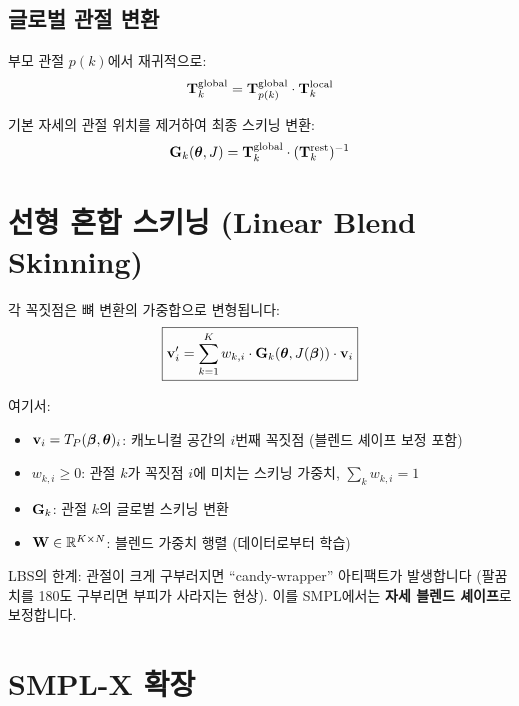 \documentclass[11pt, a4paper]{report}
\begin{document}
\subsection{글로벌 관절 변환}

부모 관절 $p(k)$에서 재귀적으로:
\begin{equation}
\mathbf{T}_k^{\text{global}} = \mathbf{T}_{p(k)}^{\text{global}} \cdot \mathbf{T}_k^{\text{local}}
\end{equation}

기본 자세의 관절 위치를 제거하여 최종 스키닝 변환:
\begin{equation}
\mathbf{G}_k(\bm{\theta}, J) = \mathbf{T}_k^{\text{global}} \cdot (\mathbf{T}_k^{\text{rest}})^{-1}
\label{eq:skinning_transform}
\end{equation}


\section{선형 혼합 스키닝 (Linear Blend Skinning)}
\label{sec:lbs}

각 꼭짓점은 뼈 변환의 가중합으로 변형됩니다:
\begin{equation}
\boxed{
\mathbf{v}_i' = \sum_{k=1}^{K} w_{k,i} \cdot \mathbf{G}_k(\bm{\theta}, J(\bm{\beta})) \cdot \mathbf{v}_i
}
\label{eq:lbs}
\end{equation}

여기서:
\begin{itemize}[leftmargin=*]
  \item $\mathbf{v}_i = T_P(\bm{\beta}, \bm{\theta})_i$: 캐노니컬 공간의 $i$번째 꼭짓점 (블렌드 셰이프 보정 포함)
  \item $w_{k,i} \geq 0$: 관절 $k$가 꼭짓점 $i$에 미치는 스키닝 가중치, $\sum_k w_{k,i} = 1$
  \item $\mathbf{G}_k$: 관절 $k$의 글로벌 스키닝 변환
  \item $\mathbf{W} \in \mathbb{R}^{K \times N}$: 블렌드 가중치 행렬 (데이터로부터 학습)
\end{itemize}

\begin{importantnote}
LBS의 한계: 관절이 크게 구부러지면 ``candy-wrapper'' 아티팩트가 발생합니다 (팔꿈치를 180도 구부리면 부피가 사라지는 현상). 이를 SMPL에서는 \textbf{자세 블렌드 셰이프}로 보정합니다.
\end{importantnote}


\section{SMPL-X 확장}
\label{sec:smplx}
\end{document}
